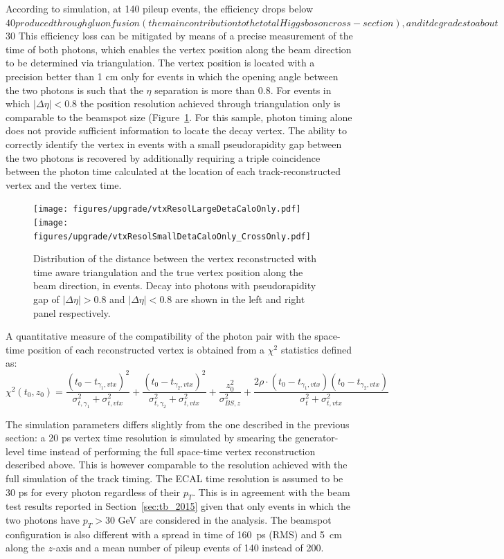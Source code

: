 According to simulation, at 140 pileup events, the efficiency drops below $40%
produced through gluon fusion (the main contribution to the total Higgs boson cross-section),
and it degrades to about $30%
This efficiency loss can be mitigated by means of a precise measurement of the time of both photons,
which enables the vertex position along the beam direction to be determined via triangulation.
The vertex position
is located with a precision better than 1 cm only for events in which the opening angle between the two
photons is such that the $\eta$ separation is more than 0.8. For events in which $|\Delta\eta|<0.8$ the position
resolution achieved through triangulation only is comparable to the beamspot size (Figure~\ref{fig:dipho_deta}.
For this sample, photon timing alone does not provide sufficient information to locate the \Hgg
decay vertex.
The ability to correctly identify the vertex in events with a small pseudorapidity gap between
the two photons is recovered by additionally requiring a triple coincidence between the photon
time calculated at the location of each track-reconstructed vertex and the vertex time.

\begin{figure}[h!]
  \centering
  \texttt{[image: figures/upgrade/vtxResolLargeDetaCaloOnly.pdf]}
  \texttt{[image: figures/upgrade/vtxResolSmallDetaCaloOnly\_CrossOnly.pdf]}
  \caption{Distribution of the distance between the vertex reconstructed with time aware
    triangulation and the true vertex position along the beam direction, in \Hgg events.
    Decay into photons with pseudorapidity gap of $|\Delta\eta| > 0.8$ and
    $|\Delta\eta| < 0.8$ are shown in the left and right panel
    respectively.}
  \label{fig:dipho_deta}
\end{figure}

A quantitative measure of  the compatibility of the photon pair with
the space-time position of each reconstructed vertex is obtained from
a $\chi^2$ statistics defined as:
\[
  \chi^2(t_0, z_0) = \frac{ (t_0 - t_{\gamma_1, vtx})^2 }{\sigma_{t, \gamma_1}^2 + \sigma_{t, vtx}^2} +
  \frac{ (t_0 - t_{\gamma_2, vtx})^2 }{\sigma_{t, \gamma_2}^2 + \sigma_{t, vtx}^2} +
  \frac{z_0^2}{\sigma_{BS, z}^2} + \frac{2\rho \cdot (t_0 - t_{\gamma_1, vtx})(t_0 - t_{\gamma_2, vtx})}{\sigma_t^2 + \sigma_{t,vtx}^2}
\]

The simulation parameters differs slightly from the one described in the previous section:
a 20 ps vertex time resolution is simulated by smearing the generator-level time instead of
performing the full space-time vertex reconstruction described above. This is however
comparable to the resolution achieved with the full simulation of the track timing.
The ECAL time resolution is assumed to be 30 ps for every photon regardless of their $p_T$. This
is in agreement with the beam test results reported in Section~\ref{sec:tb_2015} given that only
events in which the two photons have $p_T>30$ GeV are considered in the analysis.
The beamspot configuration is also different with a spread in time of 160~ps (RMS) and 5~cm along the $z$-axis and
a mean number of pileup events of 140 instead of 200.

